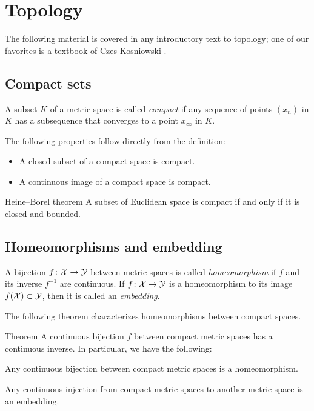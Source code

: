 \section{Topology}\label{sec:topology}

The following material is covered in any introductory text to topology; 
one of our favorites is a textbook of Czes Kosniowski \cite{kosniowski}.

\subsection*{Compact sets}

A subset $K$ of a metric space is called \emph{compact} if any sequence of points $(x_n)$ in $K$ has a subsequence that converges to a point $x_\infty$ in $K$.

The following properties follow directly from the definition:

\begin{itemize}
\item A closed subset of a compact space is compact.
\item A continuous image of a compact space is compact.
\end{itemize}

\begin{thm}{Heine--Borel theorem}\label{thm:Heine--Borel}
A subset of Euclidean space is compact if and only if it is closed and bounded.
\end{thm}


\subsection*{Homeomorphisms and embedding}

A bijection $f\colon\mathcal{X}\to\mathcal{Y}$ between metric spaces is called \emph{homeomorphism} if $f$ and its inverse $f^{-1}$ are continuous.
If $f\colon\mathcal{X}\to\mathcal{Y}$ is a homeomorphism to its image $f(\mathcal{X})\subset \mathcal{Y}$, then it is called an \emph{embedding}.

The following theorem characterizes homeomorphisms between compact spaces.

\begin{thm}{Theorem}\label{thm:Hausdorff-compact}
A continuous bijection $f$ between compact metric spaces has a continuous inverse.
In particular, we have the following:

\begin{subthm}{}
Any continuous bijection between compact metric spaces
is a homeomorphism.
\end{subthm}

\begin{subthm}{}
Any continuous injection from compact metric spaces to another metric space
is an embedding.
\end{subthm}


\end{thm}

